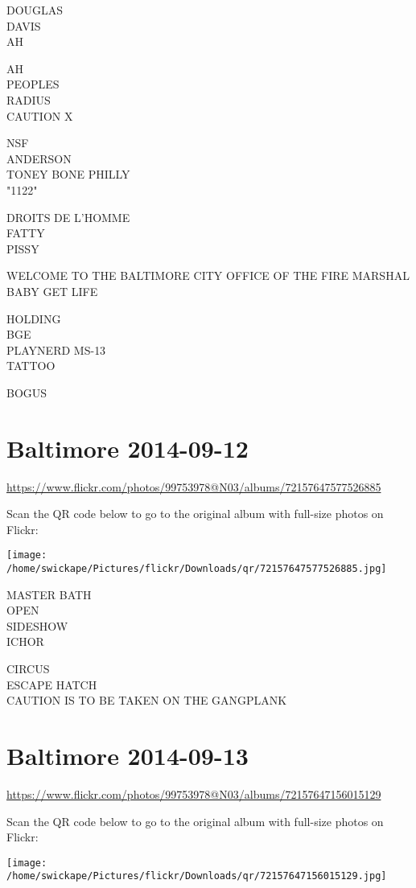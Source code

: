 \documentclass[10pt,letterpaper]{article}
\begin{document}
DOUGLAS\\
DAVIS\\
AH

AH\\
PEOPLES\\
RADIUS\\
CAUTION X

NSF\\
ANDERSON\\
TONEY BONE PHILLY\\
"1122"

DROITS DE L'HOMME\\
FATTY\\
PISSY

WELCOME TO THE BALTIMORE CITY OFFICE OF THE FIRE MARSHAL\\
BABY GET LIFE

HOLDING\\
BGE\\
PLAYNERD MS{-}13\\
TATTOO

BOGUS


\section*{Baltimore 2014-09-12}

\url{https://www.flickr.com/photos/99753978@N03/albums/72157647577526885}

Scan the QR code below to go to the original album with full-size photos on Flickr:

\texttt{[image: /home/swickape/Pictures/flickr/Downloads/qr/72157647577526885.jpg]}


MASTER BATH\\
OPEN\\
SIDESHOW\\
ICHOR

CIRCUS\\
ESCAPE HATCH\\
CAUTION IS TO BE TAKEN ON THE GANGPLANK


\section*{Baltimore 2014-09-13}

\url{https://www.flickr.com/photos/99753978@N03/albums/72157647156015129}

Scan the QR code below to go to the original album with full-size photos on Flickr:

\texttt{[image: /home/swickape/Pictures/flickr/Downloads/qr/72157647156015129.jpg]}
\end{document}
